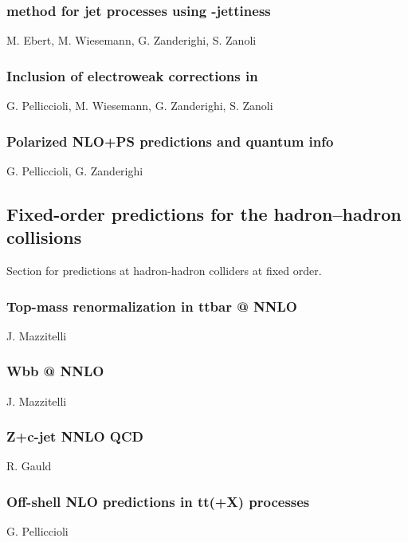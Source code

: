 \documentclass{FBR_Bericht_2025}
\begin{document}
\begin{refsection}
\subsubsection[\minnlo{} method for jet processes using $N$-jettiness]{\minnlo{} method for jet processes using -jettiness}
\begin{Namen}
M. Ebert, M. Wiesemann, G. Zanderighi, S. Zanoli
\end{Namen}
%
\subsubsection{Inclusion of electroweak corrections in \minnlo{}}
\begin{Namen}
G. Pelliccioli, M. Wiesemann, G. Zanderighi, S. Zanoli
\end{Namen}
%
\subsubsection{Polarized NLO+PS predictions and quantum info}
\begin{Namen}
G. Pelliccioli, G. Zanderighi
\end{Namen}
%
\printbibliography[heading=subbibliography]
\end{refsection}

\subsection{Fixed-order predictions for the hadron--hadron collisions}
\begin{refsection}
Section for predictions at hadron-hadron colliders at fixed order.
%
\subsubsection{Top-mass renormalization in ttbar @ NNLO}
\begin{Namen}
J. Mazzitelli
\end{Namen}
%
\subsubsection{Wbb @ NNLO}
\begin{Namen}
J. Mazzitelli
\end{Namen}
%
\subsubsection{Z+c-jet NNLO QCD}
\begin{Namen}
R. Gauld
\end{Namen}
%
\subsubsection{Off-shell NLO predictions in tt(+X) processes}
\begin{Namen}
G. Pelliccioli
\end{Namen}
%
\printbibliography[heading=subbibliography]
\end{refsection}
\end{document}
